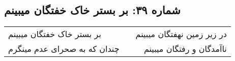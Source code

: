 \begin{center}
\section*{شماره ۳۹: بر بستر خاک خفتگان میبینم}
\label{sec:039}
\begin{longtable}{l p{0.5cm} r}
بر بستر خاک خفتگان میبینم
&&
در زیر زمین نهفتگان میبینم
\\
چندان که به صحرای عدم مینگرم
&&
ناآمدگان و رفتگان میبینم
\\
\end{longtable}
\end{center}
